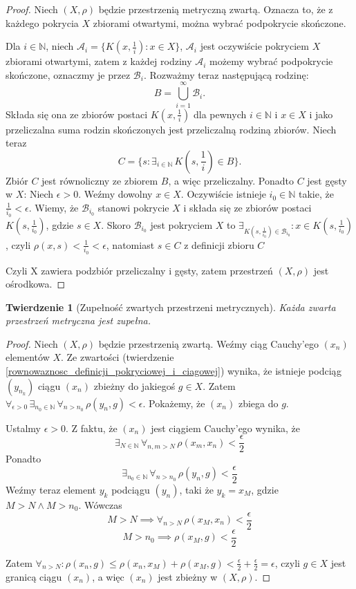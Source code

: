 \documentclass[licencjacka]{pwr_wmat_praca_dyplomowa}
\theoremstyle{plain}
\newtheorem{theorem}{Twierdzenie}
\numberwithin{theorem}{chapter}
\theoremstyle{definition}
\numberwithin{theorem}{chapter}
\begin{document}
\begin{proof}
Niech $(X, \rho)$ będzie przestrzenią metryczną zwartą. Oznacza to, że z każdego pokrycia $X$ zbiorami otwartymi, można wybrać podpokrycie skończone.

Dla $i \in \mathbb{N}$, niech $\mathcal{A}_{i} = \{ K(x, \frac{1}{i}) : x \in X \}$, $\mathcal{A}_{i}$ jest oczywiście pokryciem $X$ zbiorami otwartymi, zatem z każdej rodziny $\mathcal{A}_{i}$ możemy wybrać podpokrycie skończone, oznaczmy je przez $\mathcal{B}_{i}$. Rozważmy teraz następującą rodzinę: 
$$B = \bigcup\limits_{i=1}^{\infty} \mathcal{B}_{i}.$$
Składa się ona ze zbiorów postaci $K(x, \frac{1}{i})$ dla pewnych $i \in \mathbb{N}$ i $x \in X$ i jako przeliczalna suma rodzin skończonych jest przeliczalną rodziną zbiorów.
Niech teraz 
$$C = \{ s : \exists_{i \in \mathbb{N}} \, K(s, \frac{1}{i}) \in B \}.$$
Zbiór $C$ jest równoliczny ze zbiorem $B$, a więc przeliczalny.
Ponadto $C$ jest gęsty w $X$:
Niech $\epsilon > 0$. Weźmy dowolny $x \in X$. Oczywiście istnieje $i_0 \in \mathbb{N}$ takie, że $\frac{1}{i_0} < \epsilon$. Wiemy, że $\mathcal{B}_{i_0}$ stanowi pokrycie $X$ i składa się ze zbiorów postaci $K(s, \frac{1}{i_0})$, gdzie $s \in X$. Skoro $\mathcal{B}_{i_0}$ jest pokryciem $X$ to $\exists_{K(s, \frac{1}{i_0}) \in \mathcal{B}_{i_0}} : x \in K(s, \frac{1}{i_0})$, czyli $\rho(x, s) < \frac{1}{i_0} < \epsilon$, natomiast $s \in C$ z definicji zbioru $C$

Czyli X zawiera podzbiór przeliczalny i gęsty, zatem przestrzeń $(X, \rho)$ jest ośrodkowa.
\end{proof}


\begin{theorem}[Zupełność zwartych przestrzeni metrycznych] \label{zwarta_jest_zupelna}
Każda zwarta przestrzeń metryczna jest zupełna.
\end{theorem}

\begin{proof}
Niech $(X, \rho)$  będzie przestrzenią zwartą.
Weźmy ciąg Cauchy'ego $(x_n)$ elementów $X$. Ze zwartości (twierdzenie \ref{rownowaznosc_definicji_pokryciowej_i_ciagowej}) wynika, że istnieje podciąg $(y_{n_k})$ ciągu $(x_n)$ zbieżny do jakiegoś $g \in X$. Zatem $\forall_{\epsilon > 0} \, \exists_{n_0 \in \mathbb{N}} \, \forall_{n > n_0} \, \rho(y_n, g) < \epsilon$.
Pokażemy, że $(x_n)$ zbiega do $g$.

Ustalmy $\epsilon > 0$. Z faktu, że $(x_n)$ jest ciągiem Cauchy'ego wynika, że $$\exists_{N \in \mathbb{N}} \, \forall_{n, m > N} \, \rho(x_m, x_n) < \frac{\epsilon}{2}$$ Ponadto $$\exists_{n_0 \in \mathbb{N}} \, \forall_{n > n_0} \, \rho(y_n, g) < \frac{\epsilon}{2}$$ Weźmy teraz element $y_{k}$ podciągu $(y_n)$, taki że $y_{k} = x_M$, gdzie $M > N \land M > n_0$. Wówczas 
$$M > N \implies \forall_{n > N} \, \rho(x_M, x_n) < \frac{\epsilon}{2}$$
$$M > n_0 \implies \rho(x_M, g) < \frac{\epsilon}{2}$$

Zatem $\forall_{n > N}: \rho(x_n, g) \leq \rho(x_n, x_M) + \rho(x_M, g) < \frac{\epsilon}{2} + \frac{\epsilon}{2} = \epsilon$, czyli $g \in X$ jest granicą ciągu $(x_n)$, a więc $(x_n)$ jest zbieżny w $(X, \rho)$.
\end{proof}
\end{document}
